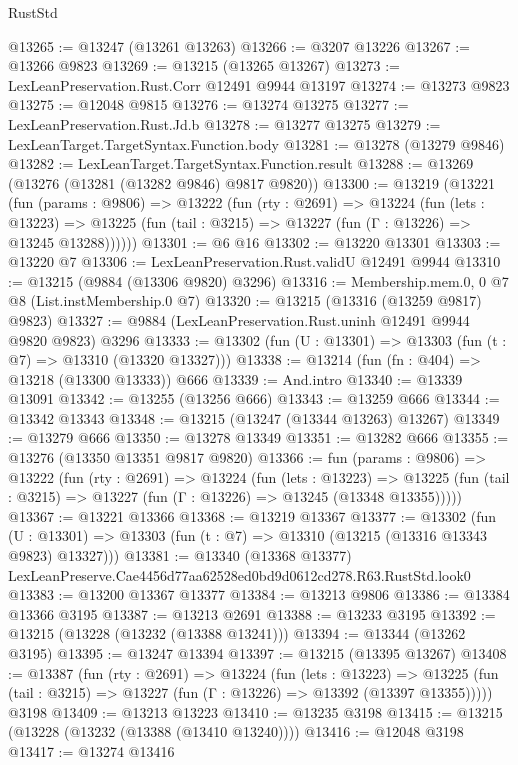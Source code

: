 \begin{lexlean}{RustStd}
\begin{coremodule}
@13265 := @13247 (@13261 @13263)
@13266 := @3207 @13226
@13267 := @13266 @9823
@13269 := @13215 (@13265 @13267)
@13273 := LexLeanPreservation.Rust.Corr @12491 @9944 @13197
@13274 := @13273 @9823
@13275 := @12048 @9815
@13276 := @13274 @13275
@13277 := LexLeanPreservation.Rust.Jd.b
@13278 := @13277 @13275
@13279 := LexLeanTarget.TargetSyntax.Function.body
@13281 := @13278 (@13279 @9846)
@13282 := LexLeanTarget.TargetSyntax.Function.result
@13288 := @13269 (@13276 (@13281 (@13282 @9846) @9817 @9820))
@13300 := @13219
    (@13221
      (fun (params : @9806) =>
      @13222
        (fun (rty : @2691) =>
        @13224
          (fun (lets : @13223) =>
          @13225 (fun (tail : @3215) => @13227 (fun (Γ : @13226) => @13245 @13288))))))
@13301 := @6 @16
@13302 := @13220 @13301
@13303 := @13220 @7
@13306 := LexLeanPreservation.Rust.validU @12491 @9944
@13310 := @13215 (@9884 (@13306 @9820) @3296)
@13316 := Membership.mem.{0, 0} @7 @8 (List.instMembership.{0} @7)
@13320 := @13215 (@13316 (@13259 @9817) @9823)
@13327 := @9884 (LexLeanPreservation.Rust.uninh @12491 @9944 @9820 @9823) @3296
@13333 := @13302 (fun (U : @13301) => @13303 (fun (t : @7) => @13310 (@13320 @13327)))
@13338 := @13214 (fun (fn : @404) => @13218 (@13300 @13333)) @666
@13339 := And.intro
@13340 := @13339 @13091
@13342 := @13255 (@13256 @666)
@13343 := @13259 @666
@13344 := @13342 @13343
@13348 := @13215 (@13247 (@13344 @13263) @13267)
@13349 := @13279 @666
@13350 := @13278 @13349
@13351 := @13282 @666
@13355 := @13276 (@13350 @13351 @9817 @9820)
@13366 := fun (params : @9806) =>
  @13222
    (fun (rty : @2691) =>
    @13224
      (fun (lets : @13223) =>
      @13225 (fun (tail : @3215) => @13227 (fun (Γ : @13226) => @13245 (@13348 @13355)))))
@13367 := @13221 @13366
@13368 := @13219 @13367
@13377 := @13302
    (fun (U : @13301) => @13303 (fun (t : @7) => @13310 (@13215 (@13316 @13343 @9823) @13327)))
@13381 := @13340 (@13368 @13377) LexLeanPreserve.Cae4456d77aa62528ed0bd9d0612cd278.R63.RustStd.look0
@13383 := @13200 @13367 @13377
@13384 := @13213 @9806
@13386 := @13384 @13366 @3195
@13387 := @13213 @2691
@13388 := @13233 @3195
@13392 := @13215 (@13228 (@13232 (@13388 @13241)))
@13394 := @13344 (@13262 @3195)
@13395 := @13247 @13394
@13397 := @13215 (@13395 @13267)
@13408 := @13387
    (fun (rty : @2691) =>
    @13224
      (fun (lets : @13223) =>
      @13225 (fun (tail : @3215) => @13227 (fun (Γ : @13226) => @13392 (@13397 @13355)))))
    @3198
@13409 := @13213 @13223
@13410 := @13235 @3198
@13415 := @13215 (@13228 (@13232 (@13388 (@13410 @13240))))
@13416 := @12048 @3198
@13417 := @13274 @13416

\end{coremodule}
\end{lexlean}
